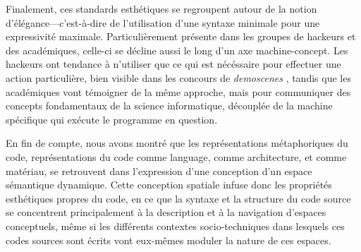 \documentclass{article}
\begin{document}
Finalement, ces standards esthétiques se regroupent autour de la notion d'élégance—c'est-à-dire de l'utilisation d'une syntaxe minimale pour une expressivité maximale. Particulièrement présente dans les groupes de hackeurs et des académiques, celle-ci se décline aussi le long d'un axe machine-concept. Les hackeurs ont tendance à n'utiliser que ce qui est nécéssaire pour effectuer une action particulière, bien visible dans les concours de \emph{demoscenes} \citep{kudra_aoc_2020}, tandis que les académiques vont témoigner de la même approche, mais pour communiquer des concepts fondamentaux de la science informatique, découplée de la machine spécifique qui exécute le programme en question.

En fin de compte, nous avons montré que les représentations métaphoriques du code, représentations du code comme language, comme architecture, et comme matériau, se retrouvent dans l'expression d'une conception d'un espace sémantique dynamique. Cette conception spatiale infuse donc les propriétés esthétiques propres du code, en ce que la syntaxe et la structure du code source se concentrent principalement à la description et à la navigation d'espaces conceptuels, même si les différents contextes socio-techniques dans lesquels ces codes sources sont écrits vont eux-mêmes moduler la nature de ces espaces.

\pagebreak



\end{document}
